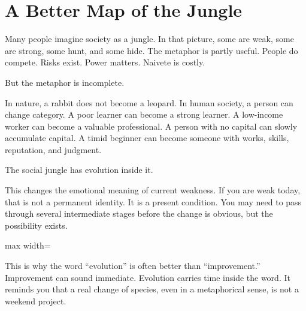 \section*{A Better Map of the Jungle}

Many people imagine society as a jungle. In that picture, some are weak, some are strong, some hunt, and some hide. The metaphor is partly useful. People do compete. Risks exist. Power matters. Naivete is costly.

But the metaphor is incomplete.

In nature, a rabbit does not become a leopard. In human society, a person can change category. A poor learner can become a strong learner. A low-income worker can become a valuable professional. A person with no capital can slowly accumulate capital. A timid beginner can become someone with works, skills, reputation, and judgment.

The social jungle has evolution inside it.

This changes the emotional meaning of current weakness. If you are weak today, that is not a permanent identity. It is a present condition. You may need to pass through several intermediate stages before the change is obvious, but the possibility exists.

\begin{center}
\begin{adjustbox}{max width=\linewidth}
\end{adjustbox}
\end{center}

This is why the word ``evolution'' is often better than ``improvement.'' Improvement can sound immediate. Evolution carries time inside the word. It reminds you that a real change of species, even in a metaphorical sense, is not a weekend project.

